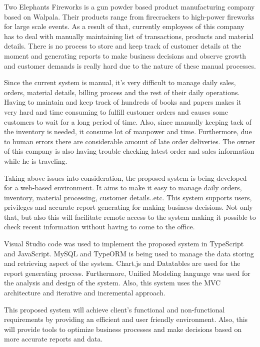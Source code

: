 \documentclass[12pt]{report}
\begin{document}
Two Elephants Fireworks is a gun powder based product manufacturing company based on Walpala. Their products range from
firecrackers to high-power fireworks for large scale events. As a result of that, currently employees of this company has to deal with manually maintaining list of transactions, products and material details. There is no process to store and keep track of customer details at the moment and generating reports to make business decisions and observe growth and customer demands is really hard due to the nature of these manual processes.

Since the current system is manual, it’s very difficult to manage daily sales, orders, material details, billing process and the rest of their daily operations. Having to maintain and keep track of hundreds of books and papers makes it very hard and time consuming to fulfill customer orders and causes some customers to wait for a long period of time. Also, since manually keeping tack of the inventory is needed, it consume lot of manpower and time. Furthermore, due to human errors there are considerable amount of late order  deliveries. The owner of this company is also having trouble checking latest order and sales information while he is traveling.

Taking above issues into consideration, the proposed system  is being developed for a web-based environment. It aims to make it easy to manage daily orders, inventory, material processing, customer details..etc. This system supports users, privileges and accurate report generating for making business decisions. Not only that, but also this will facilitate remote access to the system making it possible to check recent information without having to come to the office.

Visual Studio code was used to implement the proposed system in TypeScript and JavaScript. MySQL and TypeORM is being used to manage the data storing and retrieving aspect of the system. Chart.js and Datatables are used for the report generating process. Furthermore, Unified Modeling language was used for the analysis and design of the system. Also, this system uses the MVC architecture and iterative and incremental approach.

This proposed system will achieve client's functional and non-functional requirements by providing an efficient and user friendly environment. Also, this will provide tools to optimize business processes and make decisions based on more accurate reports and data.

\newpage
{}
\begin{singlespacing}
	\tableofcontents
\end{singlespacing}
\setlength{\parskip}{1em}
\renewcommand{\baselinestretch}{2.0}
\end{document}
